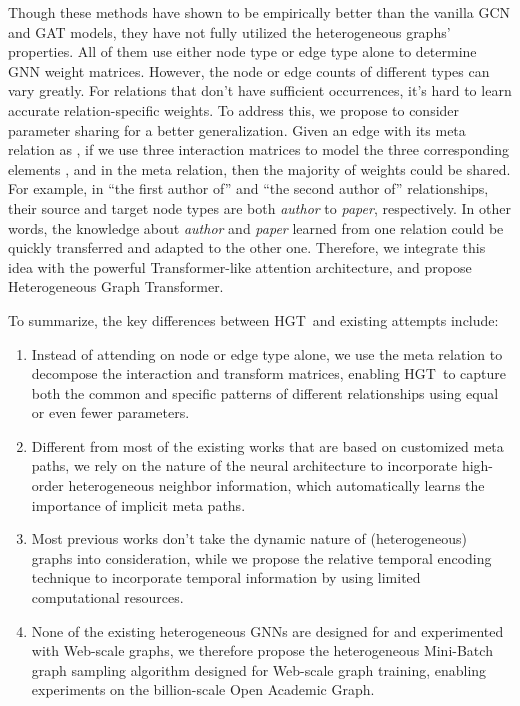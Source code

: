 \documentclass[sigconf]{acmart}
\theoremstyle{definition}
\newcommand{\model}{Heterogeneous Graph Transformer}
\newcommand{\short}{HGT}
\begin{document}
Though these methods have shown to be empirically better than the vanilla GCN and GAT models, they have not fully utilized the heterogeneous graphs' properties. All of them use either node type or edge type alone to determine GNN weight matrices. 
However, the node or edge counts of different types can vary greatly. 
For relations that don't have sufficient occurrences, it's hard to learn accurate relation-specific weights. To address this, we propose to consider parameter sharing for a better generalization. 
Given an edge   with its meta relation as , if we use three interaction matrices to model the three corresponding elements , and  in the meta relation, then the majority of weights could be shared. 
For example, in ``the first author of'' and ``the second author of'' relationships, their source and target node types are both \textit{author} to \textit{paper}, respectively. 
In other words, the knowledge about \textit{author} and \textit{paper} learned from one relation could be quickly transferred and adapted to the other one. 
Therefore, we integrate this idea with the powerful Transformer-like attention architecture, and propose \model. 

To summarize, the key differences between \short\ and existing attempts include:
\begin{enumerate}
    \item Instead of attending on node or edge type alone, we use the meta relation  to decompose the interaction and transform matrices, enabling \short\ to capture both the common and specific patterns of different relationships using equal or even fewer parameters.
    \item Different from most of the existing works that are based on customized meta paths, we rely on the nature of the neural architecture to incorporate high-order heterogeneous neighbor information, which automatically learns the importance of implicit meta paths.  
    \item Most previous works don't take the dynamic nature of (heterogeneous) graphs into consideration, while we propose the relative temporal encoding technique to incorporate temporal information by using limited computational resources.
    \item None of the existing heterogeneous GNNs are designed for and experimented with Web-scale graphs, we therefore propose the heterogeneous Mini-Batch graph sampling algorithm designed for Web-scale graph training, enabling experiments on the billion-scale Open Academic Graph.
\end{enumerate} 
\end{document}
